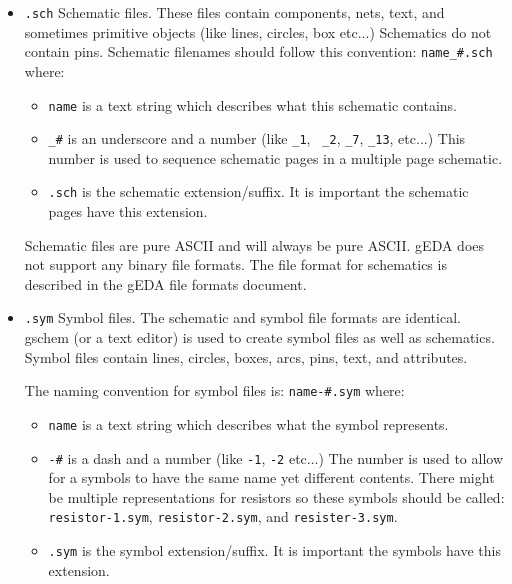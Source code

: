 \documentclass{article}
\begin{document}
\begin{itemize}
\item {\tt *.sch} Schematic files.  These files contain components,
  nets, text, and sometimes primitive objects (like lines, circles,
  box etc...)  Schematics do not contain pins.  Schematic filenames
  should follow this convention:  {\tt name\_\#.sch} where:
  \begin{itemize}
  \item {\tt name} is a text string which describes what this schematic contains.
  
  \item {\tt \_\#} is an underscore and a number (like {\tt \_1}, {\tt
      \_2}, {\tt \_7}, {\tt \_13}, etc...)  This number is used to
    sequence schematic pages in a multiple page schematic.
  
  \item {\tt .sch} is the schematic extension/suffix.  It is important
    the schematic pages have this extension.
  \end{itemize}
  
  Schematic files are pure ASCII and will always be pure ASCII.  gEDA
  does not support any binary file formats.  The file format for
  schematics is described in the gEDA file formats document.

  
\item {\tt *.sym} Symbol files.  The schematic and symbol file formats
  are identical.  gschem (or a text editor) is used to create symbol
  files as well as schematics.  Symbol files contain lines, circles,
  boxes, arcs, pins, text, and attributes.
  
  The naming convention for symbol files is:  {\tt name-\#.sym}  where:
  \begin{itemize}
  \item {\tt name} is a text string which describes what the symbol
    represents.
    
  \item {\tt -\#} is a dash and a number (like {\tt -1}, {\tt -2}
    etc...)  The number is used to allow for a symbols to have the
    same name yet different contents.  There might be multiple
    representations for resistors so these symbols should be called:
    {\tt resistor-1.sym}, {\tt resistor-2.sym}, and {\tt resister-3.sym}.
    
  \item {\tt .sym} is the symbol extension/suffix.  It is important
    the symbols have this extension.
  \end{itemize}
  

\end{itemize}
\end{document}
